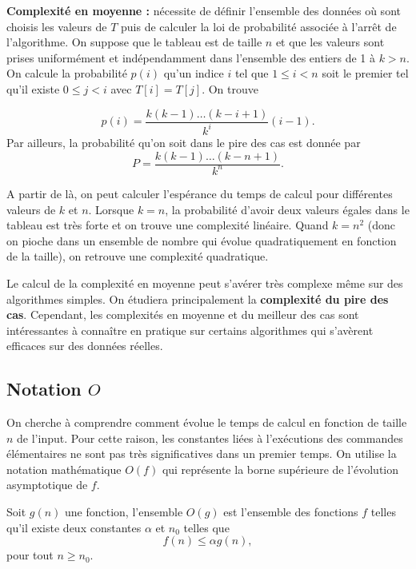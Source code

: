 \documentclass{../cours}
\begin{document}
\begin{Example}
\textbf{Complexité en moyenne :} nécessite de définir l'ensemble des données où sont choisis les valeurs de $T$ puis de calculer la loi de probabilité associée à l'arrêt de l'algorithme. On suppose que le tableau est de taille $n$ et que les valeurs sont prises uniformément et indépendamment dans l'ensemble des entiers de 1 à $k > n$. On calcule la probabilité $p(i)$ qu'un indice $i$ tel que $1 \leq i < n$ soit le premier tel qu'il existe $0 \leq j < i$ avec $T[i] = T[j]$. On trouve

\begin{equation}
p(i) = \frac{k(k-1)\dots (k-i+1)}{k^{i}}(i-1).
\end{equation}
Par ailleurs, la probabilité qu'on soit dans le pire des cas est donnée par
\begin{equation}
P = \frac{k(k-1)\dots(k-n+1)}{k^n}.
\end{equation}

A partir de là, on peut calculer l'espérance du temps de calcul pour différentes valeurs de $k$ et $n$. Lorsque $k=n$, la probabilité d'avoir deux valeurs égales dans le tableau est très forte et on trouve une complexité linéaire. Quand $k=n^2$ (donc on pioche dans un ensemble de nombre qui évolue quadratiquement en fonction de la taille), on retrouve une complexité quadratique.

\end{Example}

Le calcul de la complexité en moyenne peut s'avérer très complexe même sur des algorithmes simples. On étudiera principalement la \textbf{complexité du pire des cas}. Cependant, les complexités en moyenne et du meilleur des cas sont intéressantes à connaître en pratique sur certains algorithmes qui s'avèrent efficaces sur des données réelles. 

\subsection{Notation $O$}

On cherche à comprendre comment évolue le temps de calcul en fonction de taille $n$ de l'input. Pour cette raison, les constantes liées à l'exécutions des commandes élémentaires ne sont pas très significatives dans un premier temps. On utilise la notation mathématique $O(f)$ qui représente la borne supérieure de l'évolution asymptotique de $f$.

\begin{Definition}
Soit $g(n)$ une fonction, l'ensemble $O(g)$ est l'ensemble des fonctions $f$ telles qu'il existe deux constantes $\alpha$ et $n_0$ telles que
\begin{equation}
f(n) \leq \alpha g(n),
\end{equation}
pour tout  $n \geq n_0$.
\end{Definition}
\end{document}
